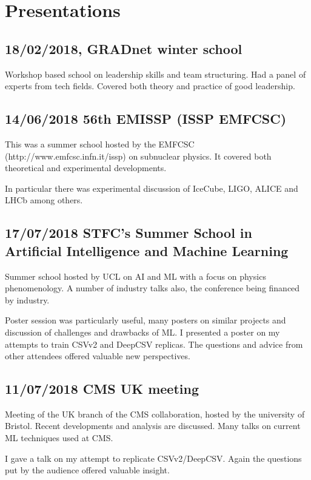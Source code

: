 \section{Presentations}\label{sec:presentations}

\tocless\subsection{18/02/2018, GRADnet winter school}
Workshop based school on leadership skills and team structuring. 
Had a panel of experts from tech fields.
Covered both theory and practice of good leadership.

\tocless\subsection{14/06/2018 56th EMISSP (ISSP EMFCSC)}
This was a summer school hosted by the EMFCSC (http://www.emfcsc.infn.it/issp) on subnuclear physics.
It covered both theoretical and experimental developments.

In particular there was experimental discussion of IceCube, LIGO, ALICE and LHCb among others.

\tocless\subsection{17/07/2018 STFC's Summer School in Artificial Intelligence and Machine Learning}
Summer school hosted by UCL on AI and ML with a focus on physics phenomenology.
A number of industry talks also, the conference being financed by industry.

Poster session was particularly useful, many posters on similar projects and discussion of challenges and drawbacks of ML.
I presented a poster on my attempts to train CSVv2 and DeepCSV replicas.
The questions and advice from other attendees offered valuable new perspectives.

\tocless\subsection{11/07/2018 CMS UK meeting}
Meeting of the UK branch of the CMS collaboration, hosted by the university of Bristol.
Recent developments and analysis are discussed.
Many talks on current ML techniques used at CMS.

I gave a talk on my attempt to replicate CSVv2/DeepCSV.
Again the questions put by the audience offered valuable insight.

